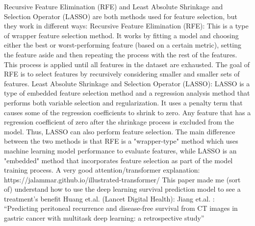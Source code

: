 \documentclass{article}%
\begin{document}
\newline%
\newline%
%
Recursive Feature Elimination (RFE) and Least Absolute Shrinkage and Selection Operator (LASSO) are both methods used for feature selection, but they work in different ways:%
\newline%
\newline%
%
Recursive Feature Elimination (RFE): This is a type of wrapper feature selection method. It works by fitting a model and choosing either the best or worst{-}performing feature (based on a certain metric), setting the feature aside and then repeating the process with the rest of the features. This process is applied until all features in the dataset are exhausted. The goal of RFE is to select features by recursively considering smaller and smaller sets of features.%
\newline%
\newline%
%
Least Absolute Shrinkage and Selection Operator (LASSO): LASSO is a type of embedded feature selection method and a regression analysis method that performs both variable selection and regularization. It uses a penalty term that causes some of the regression coefficients to shrink to zero. Any feature that has a regression coefficient of zero after the shrinkage process is excluded from the model. Thus, LASSO can also perform feature selection.%
\newline%
\newline%
%
The main difference between the two methods is that RFE is a "wrapper{-}type" method which uses machine learning model performance to evaluate features, while LASSO is an "embedded" method that incorporates feature selection as part of the model training process.%
\newline%
\newline%
%
%
\newline%
\newline%
%
A very good attention/transformer explanation: https://jalammar.github.io/illustrated{-}transformer/%
\newline%
\newline%
%
This paper made me (sort of) understand how to use the deep learning survival prediction model to see a treatment’s benefit%
\newline%
\newline%
%
Huang et.al. (Lancet Digital Health): Jiang et.al. : “Predicting peritoneal recurrence and disease{-}free survival from CT images in gastric cancer with multitask deep learning: a retrospective study”%
\end{document}
